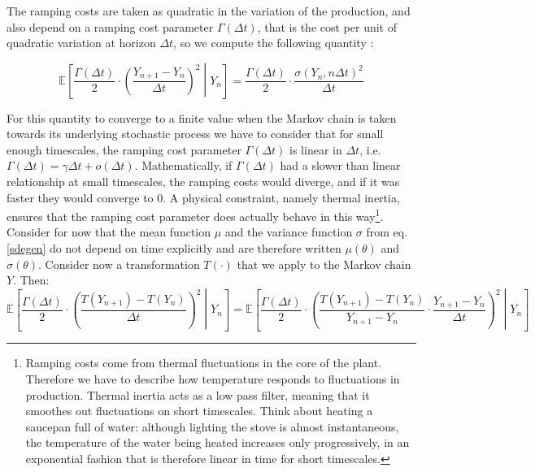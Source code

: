 The ramping costs are taken as quadratic in the variation of the production, and also depend on a ramping cost parameter $\Gamma(\Delta t)$, that is the cost per unit of quadratic variation at horizon $\Delta t$, so we compute the following quantity : 

\begin{equation}
\mathbb{E}\left[\frac{\Gamma(\Delta t)}{2}\cdot\left(\frac{Y_{n+1}-Y_n}{\Delta t}\right)^2\middle \vert Y_n  \right]=\frac{\Gamma(\Delta t)}{2}\cdot\frac{\sigma (Y_n,n \Delta t)^2}{\Delta t}
\label{markovariation}
\end{equation}

For this quantity to converge to a finite value when the Markov chain is taken towards its underlying stochastic process we have to consider that for small enough timescales, the ramping cost parameter $\Gamma(\Delta t)$ is linear in $\Delta t$, i.e. $\Gamma(\Delta t)=\gamma \Delta t +o(\Delta t)$. Mathematically, if $\Gamma(\Delta t)$ had a slower than linear relationship at small timescales, the ramping costs would diverge, and if it was faster they would converge to $0$. A physical constraint, namely thermal inertia, ensures that the ramping cost parameter does actually behave in this way\footnote{Ramping costs come from thermal fluctuations in the core of the plant. Therefore we have to describe how temperature responds to fluctuations in production. Thermal inertia acts as a low pass filter, meaning that it smoothes out fluctuations on short timescales. Think about heating a saucepan full of water: although lighting the stove is almost instantaneous, the temperature of the water being heated increases only progressively, in an exponential fashion that is therefore linear in time for short timescales. }. \\


Consider for now that the mean function $\mu$ and the variance function $\sigma$ from eq. \ref{sdegen} do not depend on time explicitly and are therefore written $\mu(\theta)$ and $\sigma(\theta)$. Consider now a transformation $T(\cdot)$ that we apply to the Markov chain $Y$. Then:
\begin{equation}
\mathbb{E}\left[\frac{\Gamma(\Delta t)}{2}\cdot\left(\frac{T(Y_{n+1})-T(Y_n)}{\Delta t}\right)^2\middle \vert Y_n  \right]= \mathbb{E}\left[\frac{\Gamma(\Delta t)}{2}\cdot\left(\frac{T(Y_{n+1})-T(Y_n)}{Y_{n+1}-Y_n}\cdot\frac{Y_{n+1}-Y_n}{\Delta t}\right)^2\middle \vert Y_n  \right]    
\label{markovcomposed}
\end{equation}

